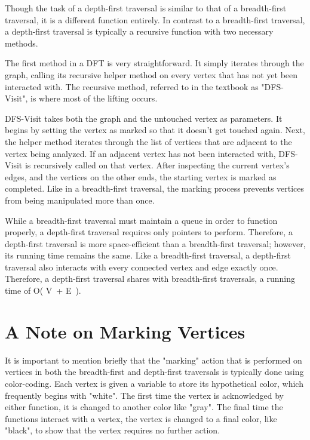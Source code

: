 \documentclass[letterpaper, 10pt]{article}
\begin{document}
Though the task of a depth-first traversal is similar to that of a breadth-first traversal, it is a different function entirely. In contrast to a breadth-first traversal, a depth-first traversal is typically a recursive function with two necessary methods.\par
The first method in a DFT is very straightforward. It simply iterates through the graph, calling its recursive helper method on every vertex that has not yet been interacted with. The recursive method, referred to in the textbook as "DFS-Visit", is where most of the lifting occurs.\par
DFS-Visit takes both the graph and the untouched vertex as parameters. It begins by setting the vertex as marked so that it doesn't get touched again. Next, the helper method iterates through the list of vertices that are adjacent to the vertex being analyzed. If an adjacent vertex has not been interacted with, DFS-Visit is recursively called on that vertex. After inspecting the current vertex's edges, and the vertices on the other ends, the starting vertex is marked as completed. Like in a breadth-first traversal, the marking process prevents vertices from being manipulated more than once.\par
While a breadth-first traversal must maintain a queue in order to function properly, a depth-first traversal requires only pointers to perform. Therefore, a depth-first traversal is more space-efficient than a breadth-first traversal; however, its running time remains the same. Like a breadth-first traversal, a depth-first traversal also interacts with every connected vertex and edge exactly once. Therefore, a depth-first traversal shares with breadth-first traversals, a running time of O( \textbar V\textbar \ + \textbar E\textbar \ ).\par

\section{A Note on Marking Vertices}\par

It is important to mention briefly that the "marking" action that is performed on vertices in both the breadth-first and depth-first traversals is typically done using color-coding. Each vertex is given a variable to store its hypothetical color, which frequently begins with "white". The first time the vertex is acknowledged by either function, it is changed to another color like "gray". The final time the functions interact with a vertex, the vertex is changed to a final color, like "black", to show that the vertex requires no further action.\par
\end{document}
